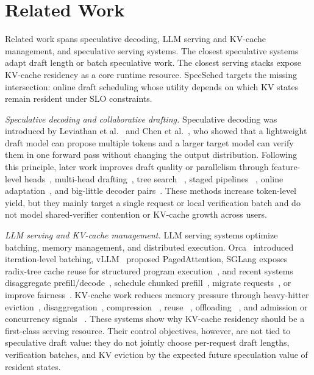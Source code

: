 \documentclass[journal]{IEEEtran}
\newcommand{\system}{SpecSched}
\begin{document}
\section{Related Work}
\label{sec:related-work}

Related work spans speculative decoding, LLM serving and KV-cache
management, and speculative serving systems. The closest speculative
systems adapt draft length or batch speculative work. The closest
serving stacks expose KV-cache residency as a core runtime resource.
\system{} targets the missing intersection: online draft scheduling
whose utility depends on which KV states remain resident under SLO
constraints.

\textit{Speculative decoding and collaborative drafting.}
Speculative decoding was introduced by Leviathan et
al.~\cite{leviathan2023fast} and Chen et
al.~\cite{chen2023accelerating}, who showed that a lightweight draft
model can propose multiple tokens and a larger target model can verify
them in one forward pass without changing the output distribution.
Following this principle, later work improves draft quality or
parallelism through feature-level heads~\cite{li2024eagle,li2024eagle2},
multi-head drafting~\cite{cai2024medusa}, tree search
~\cite{miao2024specinfer,chen2024sequoia}, staged pipelines
~\cite{spector2023accelerating}, online adaptation~\cite{liu2024online},
and big-little decoder pairs~\cite{kim2023speculative}. These methods
increase token-level yield, but they mainly target a single request or
local verification batch and do not model shared-verifier contention or
KV-cache growth across users.

\textit{LLM serving and KV-cache management.}
LLM serving systems optimize batching, memory management, and
distributed execution. Orca~\cite{yu2022orca} introduced
iteration-level batching, vLLM~\cite{kwon2023efficient} proposed
PagedAttention, SGLang exposes radix-tree cache reuse for structured
program execution~\cite{zheng2024sglang}, and recent systems
disaggregate prefill/decode~\cite{zhong2024distserve,patel2024splitwise},
schedule chunked prefill~\cite{agrawal2024taming}, migrate
requests~\cite{sun2024llumnix}, or improve
fairness~\cite{sheng2024fairness}. KV-cache work reduces memory
pressure through heavy-hitter eviction~\cite{zhang2023h2o},
disaggregation~\cite{qin2024mooncake}, compression
~\cite{liu2024cachegen,feng2025evicpress}, reuse
~\cite{gim2024prompt,cheng2025lmcache}, offloading
~\cite{xiong2024layerkv}, and admission or concurrency signals
~\cite{jaillet2025kvsched,chen2026concur}. These systems show why
KV-cache residency should be a first-class serving resource. Their
control objectives, however, are not tied to speculative draft value:
they do not jointly choose per-request draft lengths, verification
batches, and KV eviction by the expected future speculation value of
resident states.
\end{document}
